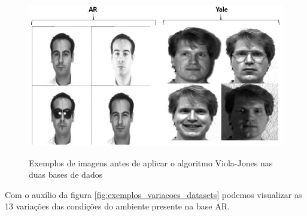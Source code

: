 \begin{figure}[H]
\centering
\caption{Exemplos de imagens antes de aplicar o algoritmo Viola-Jones nas duas bases de dados }
\includegraphics[scale=0.8]{imgs/exemplos_bases.png}
\label{fig:exemplos_datasets}
\end{figure}


Com o auxílio da figura \ref{fig:exemplos_variacoes_datasets} podemos visualizar as 13 variações das condições do ambiente presente na base AR.

